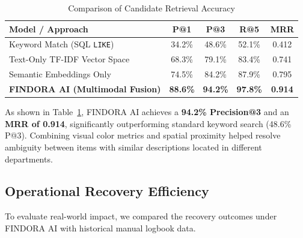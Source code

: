 \documentclass[conference]{IEEEtran}
\begin{document}
\begin{table}[htbp]
\caption{Comparison of Candidate Retrieval Accuracy}
\label{tab:retrieval_performance}
\centering
\setlength{\tabcolsep}{4pt}
\begin{tabular}{lcccc}
\toprule
\textbf{Model / Approach} & \textbf{P@1} & \textbf{P@3} & \textbf{R@5} & \textbf{MRR} \\
\midrule
Keyword Match (SQL \texttt{LIKE}) & 34.2\% & 48.6\% & 52.1\% & 0.412 \\
Text-Only TF-IDF Vector Space & 68.3\% & 79.1\% & 83.4\% & 0.741 \\
Semantic Embeddings Only & 74.5\% & 84.2\% & 87.9\% & 0.795 \\
\textbf{FINDORA AI (Multimodal Fusion)} & \textbf{88.6\%} & \textbf{94.2\%} & \textbf{97.8\%} & \textbf{0.914} \\
\bottomrule
\end{tabular}
\end{table}

As shown in Table~\ref{tab:retrieval_performance}, FINDORA AI achieves a \textbf{94.2\% Precision@3} and an \textbf{MRR of 0.914}, significantly outperforming standard keyword search (48.6\% P@3). Combining visual color metrics and spatial proximity helped resolve ambiguity between items with similar descriptions located in different departments.

\subsection{Operational Recovery Efficiency}
To evaluate real-world impact, we compared the recovery outcomes under FINDORA AI with historical manual logbook data.

\begin{table}[htbp]
\caption{Campus Operational Recovery Metrics}
\label{tab:operational_metrics}
\centering
{}
\end{table}
\end{document}
